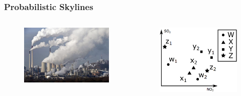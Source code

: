 \documentclass{beamer}
\begin{document}
\begin{frame}
\frametitle{Probabilistic Skylines}
\begin{columns}[c] %

\begin{figure}[htpb]
  \begin{center}
	\includegraphics[width=1\linewidth]{pollution.jpg}
  \end{center}
\end{figure}
\begin{figure}[htpb]
  \begin{center}
	\includegraphics[width=0.75\linewidth]{coordinate.png}
  \end{center}
\end{figure}


\end{columns}
\end{frame}
\end{document}
